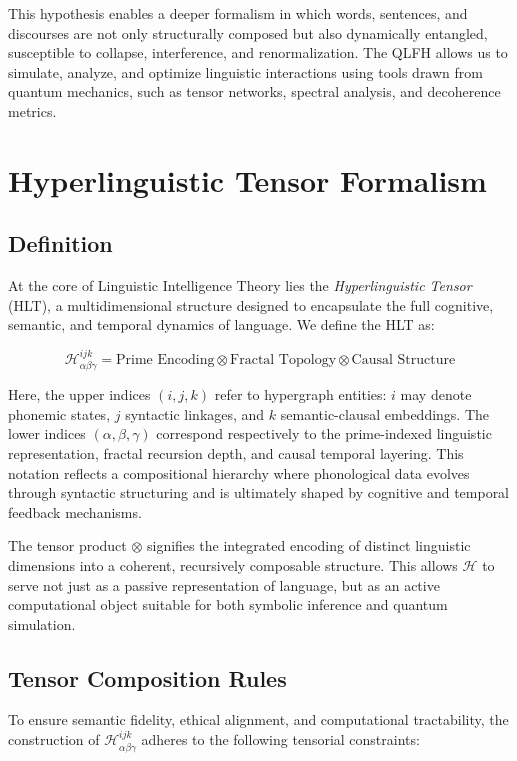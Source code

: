 \documentclass{article}
\theoremstyle{plain}
\theoremstyle{claimstyle}
\begin{document}
This hypothesis enables a deeper formalism in which words, sentences, and discourses are not only structurally composed but also dynamically entangled, susceptible to collapse, interference, and renormalization. The QLFH allows us to simulate, analyze, and optimize linguistic interactions using tools drawn from quantum mechanics, such as tensor networks, spectral analysis, and decoherence metrics.

\section{Hyperlinguistic Tensor Formalism}

\subsection{Definition}

At the core of Linguistic Intelligence Theory lies the \textit{Hyperlinguistic Tensor} (HLT), a multidimensional structure designed to encapsulate the full cognitive, semantic, and temporal dynamics of language. We define the HLT as:

\[
\mathcal{H}_{\alpha\beta\gamma}^{ijk} = \text{Prime Encoding} \otimes \text{Fractal Topology} \otimes \text{Causal Structure}
\]

Here, the upper indices $(i, j, k)$ refer to hypergraph entities: $i$ may denote phonemic states, $j$ syntactic linkages, and $k$ semantic-clausal embeddings. The lower indices $(\alpha, \beta, \gamma)$ correspond respectively to the prime-indexed linguistic representation, fractal recursion depth, and causal temporal layering. This notation reflects a compositional hierarchy where phonological data evolves through syntactic structuring and is ultimately shaped by cognitive and temporal feedback mechanisms.

The tensor product $\otimes$ signifies the integrated encoding of distinct linguistic dimensions into a coherent, recursively composable structure. This allows $\mathcal{H}$ to serve not just as a passive representation of language, but as an active computational object suitable for both symbolic inference and quantum simulation.

\subsection{Tensor Composition Rules}

To ensure semantic fidelity, ethical alignment, and computational tractability, the construction of $\mathcal{H}_{\alpha\beta\gamma}^{ijk}$ adheres to the following tensorial constraints:
\end{document}
